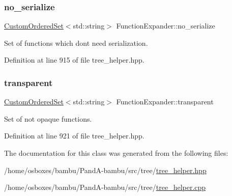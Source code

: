 \subsubsection{\texorpdfstring{no\+\_\+serialize}{no\_serialize}}
{\footnotesize\ttfamily \hyperlink{classCustomOrderedSet}{Custom\+Ordered\+Set}$<$std\+::string$>$ Function\+Expander\+::no\+\_\+serialize\hspace{0.3cm}{\ttfamily [private]}}



Set of functions which don\textquotesingle{}t need serialization. 



Definition at line 915 of file tree\+\_\+helper.\+hpp.

\mbox{\label{classFunctionExpander_a5111c45183f4a133cae17775d8debe26}} 
\subsubsection{\texorpdfstring{transparent}{transparent}}
{\footnotesize\ttfamily \hyperlink{classCustomOrderedSet}{Custom\+Ordered\+Set}$<$std\+::string$>$ Function\+Expander\+::transparent\hspace{0.3cm}{\ttfamily [private]}}



Set of not opaque functions. 



Definition at line 921 of file tree\+\_\+helper.\+hpp.



The documentation for this class was generated from the following files\+:\begin{DoxyCompactItemize}
\item 
/home/osboxes/bambu/\+Pand\+A-\/bambu/src/tree/\hyperlink{tree__helper_8hpp}{tree\+\_\+helper.\+hpp}\item 
/home/osboxes/bambu/\+Pand\+A-\/bambu/src/tree/\hyperlink{tree__helper_8cpp}{tree\+\_\+helper.\+cpp}\end{DoxyCompactItemize}
